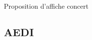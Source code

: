            \begin{center}    
                Proposition d'affiche concert  
            \end{center}
            
    \subsection{AEDI}
            
